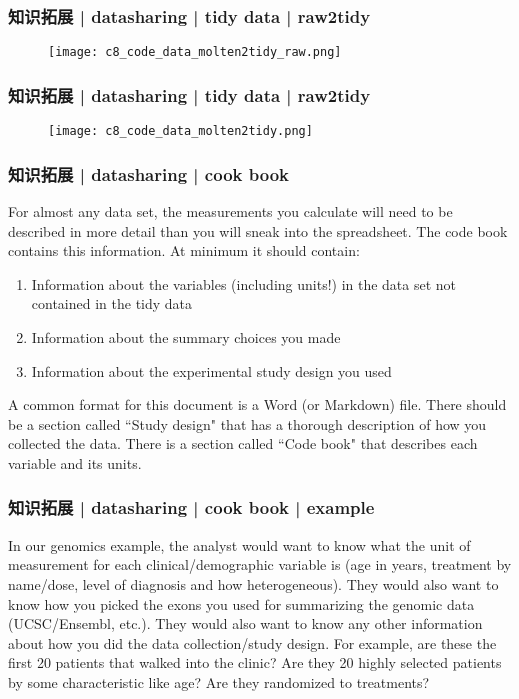\begin{frame}
  \frametitle{知识拓展 | datasharing | tidy data | raw2tidy}
  \begin{figure}
    \centering
    \texttt{[image: c8\_code\_data\_molten2tidy\_raw.png]}
  \end{figure}
\end{frame}

\begin{frame}
  \frametitle{知识拓展 | datasharing | tidy data | raw2tidy}
  \begin{figure}
    \centering
    \texttt{[image: c8\_code\_data\_molten2tidy.png]}
  \end{figure}
\end{frame}

\begin{frame}
  \frametitle{知识拓展 | datasharing | cook book}
  For almost any data set, the measurements you calculate will need to be described in more detail than you will sneak into the spreadsheet.  The code book contains this information. At minimum it should contain:
  \begin{enumerate}
    \item Information about the variables (including units!) in the data set not contained in the tidy data
    \item Information about the summary choices you made
    \item Information about the experimental study design you used
  \end{enumerate}

  A common format for this document is a Word (or Markdown) file. There should be a section called ``Study design" that has a thorough description of how you collected the data. There is a section called ``Code book" that describes each variable and its units. 
\end{frame}

\begin{frame}
  \frametitle{知识拓展 | datasharing | cook book | example}
  In our genomics example, the analyst would want to know what the unit of measurement for each clinical/demographic variable is (age in years, treatment by name/dose, level of diagnosis and how heterogeneous). They would also want to know how you picked the exons you used for summarizing the genomic data (UCSC/Ensembl, etc.). They would also want to know any other information about how you did the data collection/study design. For example, are these the first 20 patients that walked into the clinic? Are they 20 highly selected patients by some characteristic like age? Are they randomized to treatments? 
\end{frame}

